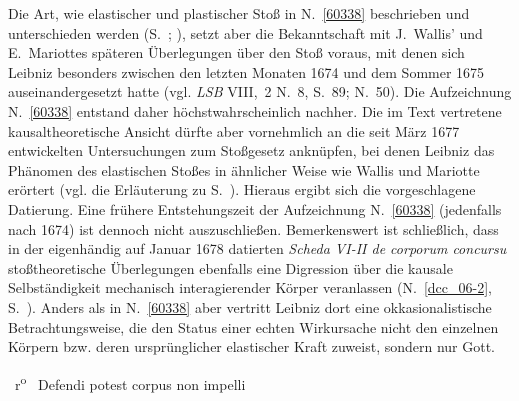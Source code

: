 \begin{ledgroup}
Die Art, wie elastischer und plastischer Stoß in N.~\ref{60338} %
beschrieben und unterschieden werden (S.~; ), setzt aber die Bekanntschaft mit J.~Wallis'%
\protect{}
und E.~Mariottes%
\protect{}
späteren Überlegungen über den Stoß voraus, mit denen sich Leibniz besonders zwischen den letzten Monaten 1674 und dem Sommer 1675 auseinandergesetzt hatte (vgl. \textit{LSB} VIII,~2 N.~8,\cite{01343} S.~89; N.~50\cite{01292}).
Die Aufzeichnung N.~\ref{60338} %
entstand daher höchstwahrscheinlich nachher. 
Die im Text vertretene kausaltheoretische Ansicht dürfte aber vornehmlich an die seit März 1677 entwickelten Untersuchungen zum Stoßgesetz anknüpfen, bei denen Leibniz das Phänomen des elastischen Stoßes in ähnlicher Weise wie Wallis und Mariotte erörtert
(vgl. die Erläuterung zu S.~).
Hieraus ergibt sich die vorgeschlagene Datierung.
Eine frühere Entstehungszeit der Aufzeichnung N.~\ref{60338} %
(jedenfalls nach 1674) ist dennoch nicht auszuschließen.
\pend%
%
\pstart%
Bemerkenswert ist schließlich, dass in der eigenhändig auf Januar 1678 datierten \textit{Scheda VI-II de corporum concursu} stoßtheoretische Überlegungen ebenfalls eine Digression über die kausale Selbständigkeit mechanisch interagierender Körper veranlassen (N.~\ref{dcc_06-2}, %
S.~).
Anders als in N.~\ref{60338} %
aber vertritt Leibniz dort eine okkasionalistische Betrachtungsweise, die den Status einer echten Wirkursache nicht den einzelnen Körpern bzw. deren ursprünglicher elastischer Kraft zuweist, sondern nur Gott.
\pend%
\end{ledgroup}%
%
%
\frenchspacing%
%
%
\newpage%
\count{}
\count{}
\count{}
\pstart%
\normalsize%
\noindent%
%
~r\textsuperscript{o}\rbrack\ %
%
Defendi potest corpus non impelli%
\protect{}%
\protect{}
%
